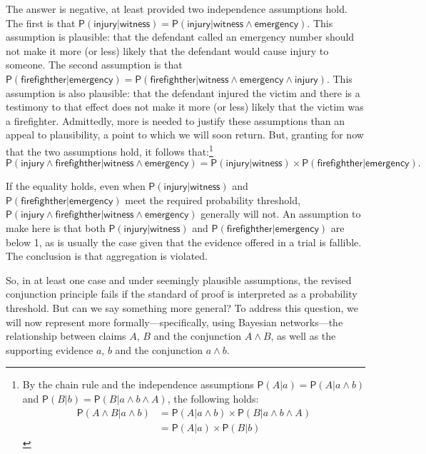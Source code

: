 \documentclass[
  10pt,
  dvipsnames,enabledeprecatedfontcommands]{scrartcl}
\newcommand{\pr}[1]{\ensuremath{\mathsf{P}(#1)}}
\begin{document}
The answer is negative, at least provided two independence assumptions
hold. The first is that
\(\pr{\textsf{injury} \vert \textsf{witness}}=\pr{\textsf{injury} \vert \textsf{witness} \wedge \textsf{emergency}}\).
This assumption is plausible: that the defendant called an emergency
number should not make it more (or less) likely that the defendant would
cause injury to someone. The second assumption is that
\(\pr{\textsf{firefighther} \vert \textsf{emergency} }=\pr{\textsf{firefighther} \vert \textsf{witness} \wedge \textsf{emergency} \wedge \textsf{injury}}\).
This assumption is also plausible: that the defendant injured the victim
and there is a testimony to that effect does not make it more (or less)
likely that the victim was a firefighter. Admittedly, more is needed to
justify these assumptions than an appeal to plausibility, a point to
which we will soon return. But, granting for now that the two
assumptions hold, it follows that:\footnote{By the chain rule and the
  independence assumptions \(\pr{A | a}=\pr{A | a \wedge b}\) and
  \(\pr{B | b}=\pr{B | a \wedge b \wedge A}\), the following holds:
  \begin{align*}
  \pr{A \wedge  B \vert a \wedge b}& =\pr{A \vert a \wedge b} \times \pr{B \vert  a \wedge b \wedge A}\\
   & = \pr{A \vert a} \times \pr{B \vert  b}
   \end{align*}}
\[\pr{\textsf{injury} \wedge \textsf{firefighther} \vert \textsf{witness} \wedge \textsf{emergency}}= \pr{\textsf{injury} \vert \textsf{witness}} \times \pr{\textsf{firefighther} \vert \textsf{emergency}}. \]

\noindent If the equality holds, even when
\(\pr{\textsf{injury} \vert \textsf{witness}}\) and
\(\pr{\textsf{firefighther} \vert \textsf{emergency} }\) meet the
required probability threshold,
\(\pr{\textsf{injury} \wedge \textsf{firefighther} \vert \textsf{witness} \wedge \textsf{emergency}}\)
generally will not. An assumption to make here is that both
\(\pr{\textsf{injury} \vert \textsf{witness}}\) and
\(\pr{\textsf{firefighther} \vert \textsf{emergency} }\) are below 1, as
is usually the case given that the evidence offered in a trial is
fallible. The conclusion is that aggregation is violated.

So, in at least one case and under seemingly plausible assumptions, the
revised conjunction principle fails if the standard of proof is
interpreted as a probability threshold. But can we say something more
general? To address this question, we will now represent more
formally---specifically, using Bayesian networks---the relationship
between claims \(A\), \(B\) and the conjunction \(A\wedge B\), as well
as the supporting evidence \(a\), \(b\) and the conjunction
\(a\wedge b\).
\end{document}
